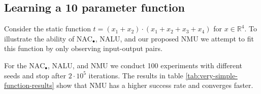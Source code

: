 \subsection{Learning a 10 parameter function}
Consider the static function $t = (x_1 + x_2) \cdot (x_1 + x_2 + x_3 + x_4)$ for $x \in \mathbb{R}^4$. To illustrate the ability of $\mathrm{NAC}_{\bullet}$, NALU, and our proposed NMU we attempt to fit this function by only observing input-output pairs.

For the $\mathrm{NAC}_{\bullet}$, NALU, and NMU we conduct 100 experiments with different seeds and stop after $2 \cdot 10^5$ iterations. The results in table \ref{tab:very-simple-function-results} show that NMU has a higher success rate and converges faster.

